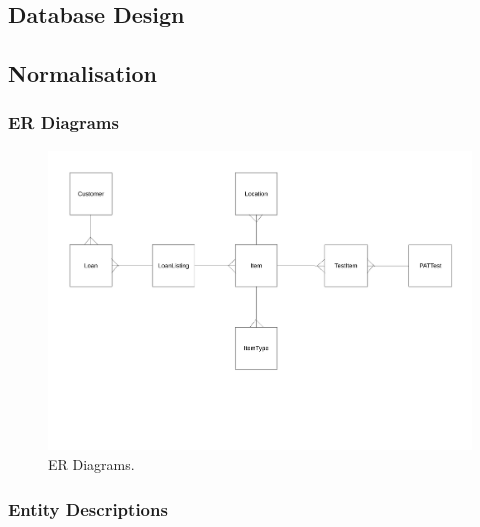 \begin{landscape}

\section{Database Design}

\subsection{Normalisation}

\subsubsection{ER Diagrams}

\begin{figure}[H]
    \centerline{\includegraphics[width=490px]{./Design/Database_Design/Normalisation/ER_Diagrams/ER_Diagram.pdf}}
    \caption{ER Diagrams.} \label{fig:ER Diagrams}
\end{figure}

\end{landscape}

\subsubsection{Entity Descriptions}

